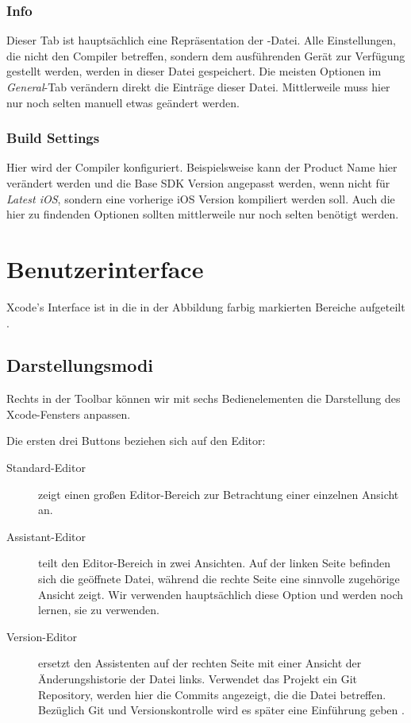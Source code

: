 \documentclass[parskip=half, final]{scrreprt}
\begin{document}
\subsubsection{Info}

Dieser Tab ist hauptsächlich eine Repräsentation der -Datei. Alle Einstellungen, die nicht den Compiler betreffen, sondern dem ausführenden Gerät zur Verfügung gestellt werden, werden in dieser Datei gespeichert. Die meisten Optionen im \emph{General}-Tab verändern direkt die Einträge dieser Datei. Mittlerweile muss hier nur noch selten manuell etwas geändert werden.

\subsubsection{Build Settings}

Hier wird der Compiler konfiguriert. Beispielsweise kann der Product Name hier verändert werden und die Base SDK Version angepasst werden, wenn nicht für \emph{Latest iOS}, sondern eine vorherige iOS Version kompiliert werden soll. Auch die hier zu findenden Optionen sollten mittlerweile nur noch selten benötigt werden.

\section{Benutzerinterface}

Xcode's Interface ist in die in der Abbildung farbig markierten Bereiche aufgeteilt .


\subsection{Darstellungsmodi}

Rechts in der Toolbar können wir mit sechs Bedienelementen die Darstellung des Xcode-Fensters anpassen.

Die ersten drei Buttons beziehen sich auf den Editor:
\begin{description}
\item[Standard-Editor] zeigt einen großen Editor-Bereich zur Betrachtung einer einzelnen Ansicht an.
\item[Assistant-Editor] teilt den Editor-Bereich in zwei Ansichten. Auf der linken Seite befinden sich die geöffnete Datei, während die rechte Seite eine sinnvolle zugehörige Ansicht zeigt. Wir verwenden hauptsächlich diese Option und werden noch lernen, sie zu verwenden.
\item[Version-Editor] ersetzt den Assistenten auf der rechten Seite mit einer Ansicht der Änderungshistorie der Datei links. Verwendet das Projekt ein Git Repository, werden hier die Commits angezeigt, die die Datei betreffen. Bezüglich Git und Versionskontrolle wird es später eine Einführung geben .
\end{description}
\end{document}
